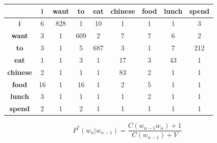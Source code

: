        \begin{center}
            \begin{tabular}{|c|c|c|c|c|c|c|c|c|}
                \hline
                 & \textbf{i} & \textbf{want} & \textbf{to} & \textbf{eat} & \textbf{chinese} & \textbf{food} & \textbf{lunch} & \textbf{spend} \\ 
                 \hline
                \textbf{i} & 6 & 828 & {\color{blue}1} & 10 & {\color{blue}1} & {\color{blue}1} & {\color{blue}1} & 3 \\ 
                \textbf{want} & 3 & {\color{blue}1} & 609 & 2 & 7 & 7 & 6 & 2 \\ 
                \textbf{to} & 3 & {\color{blue}1} & 5 & 687 & 3 & {\color{blue}1} & 7 & 212 \\ 
                \textbf{eat} & {\color{blue}1} & {\color{blue}1} & 3 & {\color{blue}1} & 17 & 3 & 43 & {\color{blue}1} \\ 
                \textbf{chinese} & 2 & {\color{blue}1} & {\color{blue}1} & {\color{blue}1} & 83 & 2 & {\color{blue}1} & {\color{blue}1} \\ 
                \textbf{food} & 16 & {\color{blue}1} & 16 & {\color{blue}1} & 2 & 5 & {\color{blue}1} & {\color{blue}1} \\ 
                \textbf{lunch} & 3 & {\color{blue}1} & {\color{blue}1} & {\color{blue}1} & {\color{blue}1} & 2 & {\color{blue}1} & {\color{blue}1} \\ 
                \textbf{spend} & 2 & {\color{blue}1} & 2 & {\color{blue}1} & {\color{blue}1} & {\color{blue}1} & {\color{blue}1} & {\color{blue}1} \\ 
                \hline
            \end{tabular}
        \end{center}

        $$
        P^*(w_n|w_{n-1}) = \frac{C(w_{n-1}w_n) + 1}{C(w_{n-1}) + V}
        $$

